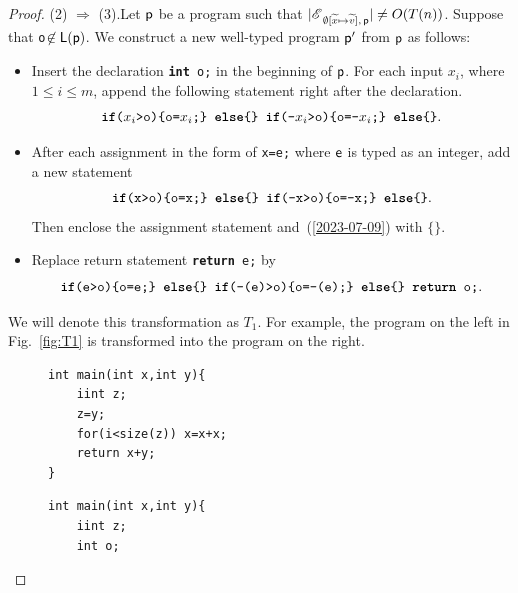 \documentclass[runningheads]{llncs}
\begin{document}
\begin{proof}
\vspace*{1mm}
\noindent
(2) $\Rightarrow$ (3).\quad Let $\mathsf{p}$ be a program such that $\vert\mathscr{E}_{\;\emptyset[\widetilde{x}\mapsto{\widetilde{v}}],\,\mathsf{p}}\vert\neq O(T(n))$.
Suppose that \texttt{o}$\not\in\mathsf{L}(\mathsf{p})$. We construct a new well-typed program $\mathsf{p}'$ from $\mathsf{p}$ as follows:
\begin{itemize}
    \item[a)] Insert the declaration \texttt{\textbf{int} o;} in the beginning of $\mathsf{p}$. For each input $x_i$, where $1 \le i \le m$, append the following statement right after the declaration.
\begin{equation}
\texttt{\textbf{if}(}x_i\texttt{>o)\{o=}x_i\texttt{;\} \textbf{else}\{\} \textbf{if}(-}x_i\texttt{>o)\{o=-}x_i\texttt{;\} \textbf{else}\{\}}.
\end{equation}
    \item[b)] After each assignment in the form of \texttt{x=e;} where $\mathsf{e}$ is typed as an integer, add a new statement
\begin{equation}\label{2023-07-09}
\texttt{\textbf{if}(x>o)\{o=x;\} \textbf{else}\{\} \textbf{if}(-x>o)\{o=-x;\} \textbf{else}\{\}}.
\end{equation}
    Then enclose the assignment statement and~(\ref{2023-07-09})  with $\texttt{\{\}}$.
    \item[c)] Replace return statement \texttt{\textbf{return} e;} by
    \begin{equation*}
    \texttt{\textbf{if}(e>o)\{o=e;\} \textbf{else}\{\} \textbf{if}(-(e)>o)\{o=-(e);\} \textbf{else}\{\} \textbf{return} o;}.
    \end{equation*}
\end{itemize}
We will denote this transformation as $T_1$. For example, the program on the left in Fig.~\ref{fig:T1} is transformed into the program on the right.
\begin{figure}[t]
\begin{minipage}{0.45\linewidth}
\centering
\begin{lstlisting}[xleftmargin=0em,xrightmargin=1.5em]
int main(int x,int y){
    iint z;
    z=y;
    for(i<size(z)) x=x+x;
    return x+y;
}
\end{lstlisting}
\end{minipage}
\hspace{10mm}
\begin{minipage}{0.45\linewidth}
\centering
\begin{lstlisting}[xleftmargin=-1em,xrightmargin=0em]
int main(int x,int y){
    iint z;
    int o;

\end{lstlisting}
\end{minipage}
\end{figure}
\end{proof}
\end{document}
